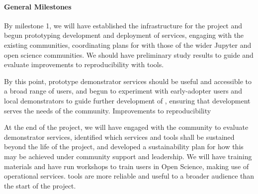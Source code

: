 



\paragraph{General Milestones}

\begin{milestones}
  {
  By milestone 1, we will have established the infrastructure
  for the project and begun prototyping development and deployment of services,
  engaging with the existing communities,
  coordinating plans for \TheProject with those of the wider Jupyter and open science communities.
  We should have preliminary study results to guide and evaluate improvements to reproducibility
  with \TheProject tools.
  }

  {
  By this point, prototype demonstrator services should be useful and accessible
  to a broad range of users, and begun to experiment with early-adopter
  users and local demonstrators to guide further development of \TheProject,
  ensuring that development serves the needs of the community.
  Improvements to reproducibility
  }

  {
  At the end of the project,
  we will have engaged with the community to evaluate demonstrator services,
  identified which services and tools shall be sustained beyond the life of the project,
  and developed a sustainability plan for how this may be achieved under community support and leadership.
  We will have training materials and have run workshops to train users in Open Science,
  making use of operational \TheProject services.
  \TheProject tools are more reliable and useful to a broader audience than the start of the project.
  }


\end{milestones}
